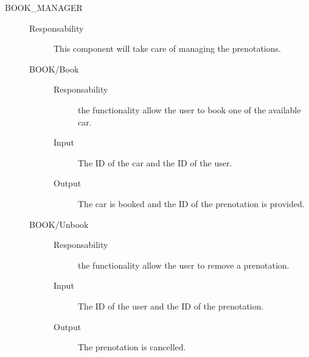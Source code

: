 \documentclass[11pt]{article} %
\begin{document}
\begin{description}
	\item[BOOK\_MANAGER] \hfill
	\begin{description}
		\item[Responsability] This component will take care of managing the prenotations.
	\item[BOOK/Book] \hfill
		\begin{description}
			\item[Responsability] the functionality allow the user to book one of the available car.
			\item[Input] The ID of the car and the ID of the user.
			\item[Output] The car is booked and the ID of the prenotation is provided.
		\end{description}
	\item[BOOK/Unbook] \hfill
		\begin{description}
			\item[Responsability] the functionality allow the user to remove a prenotation.
			\item[Input] The ID of the user and the ID of the prenotation.
			\item[Output] The prenotation is cancelled.
		\end{description}
	\end{description}
	

\end{description}
\end{document}
